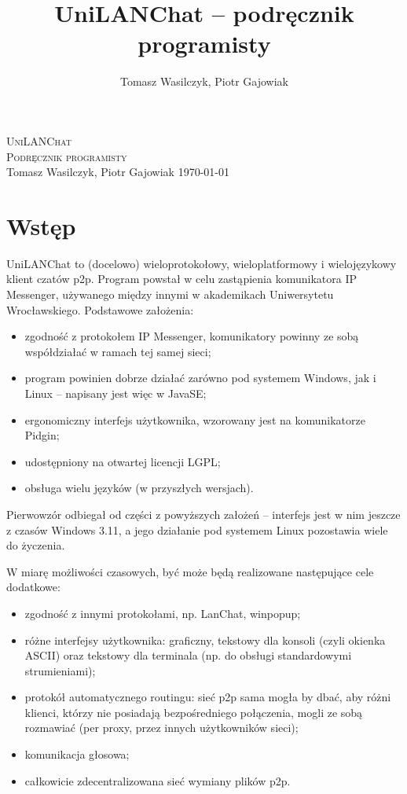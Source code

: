 \documentclass[11pt,leqno]{article}
\author{Tomasz Wasilczyk, Piotr Gajowiak}
\title{UniLANChat -- podręcznik programisty}
\begin{document}
\begin{titlepage}
\begin{center}
	\vspace*{6cm}
	\textsc{\LARGE UniLANChat}\\[0.25cm]
	\textsc{\Large Podręcznik programisty}\\[1cm]
	Tomasz Wasilczyk, Piotr Gajowiak
	\vfill
	\today
\end{center}
\end{titlepage}

\tableofcontents

\section{Wstęp}
UniLANChat to (docelowo) wieloprotokołowy, wieloplatformowy i wielojęzykowy klient czatów p2p.
Program powstał w celu zastąpienia komunikatora IP Messenger, używanego między innymi w akademikach
Uniwersytetu Wrocławskiego. Podstawowe założenia:
\begin{itemize}
	\item zgodność z protokołem IP Messenger, komunikatory powinny ze sobą współdziałać w ramach tej
	samej sieci;
	\item program powinien dobrze działać zarówno pod systemem Windows, jak i Linux -- napisany jest
	więc w JavaSE;
	\item ergonomiczny interfejs użytkownika, wzorowany jest na komunikatorze Pidgin;
	\item udostępniony na otwartej licencji LGPL;
	\item obsługa wielu języków (w przyszłych wersjach).
\end{itemize}

Pierwowzór odbiegał od części z powyższych założeń -- interfejs jest w nim jeszcze z czasów
Windows 3.11, a jego działanie pod systemem Linux pozostawia wiele do życzenia.

\vspace{1cm}
W miarę możliwości czasowych, być może będą realizowane następujące cele dodatkowe:
\begin{itemize}
	\item zgodność z innymi protokołami, np. LanChat, winpopup;
	\item różne interfejsy użytkownika: graficzny, tekstowy dla konsoli (czyli okienka ASCII) oraz
	tekstowy dla terminala (np. do obsługi standardowymi strumieniami);
	\item protokół automatycznego routingu: sieć p2p sama mogła by dbać, aby różni klienci,
	którzy nie posiadają bezpośredniego połączenia, mogli ze sobą rozmawiać (per proxy, przez innych
	użytkowników sieci);
	\item komunikacja głosowa;
	\item całkowicie zdecentralizowana sieć wymiany plików p2p.
\end{itemize}
\end{document}
